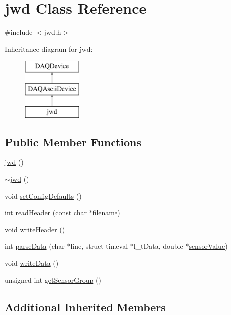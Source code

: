 \hypertarget{classjwd}{\section{jwd Class Reference}
\label{classjwd}
}


{\ttfamily \#include $<$jwd.\-h$>$}

Inheritance diagram for jwd\-:\begin{figure}[H]
\begin{center}
\leavevmode
\includegraphics[height=3.000000cm]{classjwd}
\end{center}
\end{figure}
\subsection*{Public Member Functions}
\begin{DoxyCompactItemize}
\item 
\hyperlink{classjwd_a028e5c3cf5dfae165269e8d2afb1930b}{jwd} ()
\item 
\hyperlink{classjwd_a161d08673674ab70d208c78a61bc4b16}{$\sim$jwd} ()
\item 
void \hyperlink{classjwd_ae1e9dc000396fc7078c6300f92f1012e}{set\-Config\-Defaults} ()
\item 
int \hyperlink{classjwd_afb8c407ba5ff5f9c712b11a9bd4a6657}{read\-Header} (const char $\ast$\hyperlink{classDAQDevice_a7f9cda7cf5b41f6b134c313477e9644b}{filename})
\item 
void \hyperlink{classjwd_a51681be8332cc4c174f07e27f5abe594}{write\-Header} ()
\item 
int \hyperlink{classjwd_ae3124d496889e0e756cc9688c4a9a5d7}{parse\-Data} (char $\ast$line, struct timeval $\ast$l\-\_\-t\-Data, double $\ast$\hyperlink{classDAQDevice_ad148188c57598fdf4fd4c1c333aeb0d8}{sensor\-Value})
\item 
void \hyperlink{classjwd_a1476f415afb8ec97f0a5c1dfecf13fc3}{write\-Data} ()
\item 
unsigned int \hyperlink{classjwd_aad72b312ba156e4cd3459121abbf89ef}{get\-Sensor\-Group} ()
\end{DoxyCompactItemize}
\subsection*{Additional Inherited Members}


